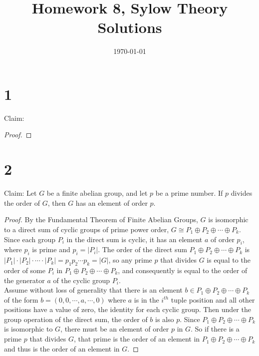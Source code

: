 \documentclass{article}
\title{\textbf{Homework 8, Sylow Theory Solutions}}
\date{}
\date\today
\begin{document}
\maketitle %

\thispagestyle{firstpage}
\section*{1}

Claim: 

\begin{proof}

\end{proof}


\section*{2}

Claim: Let $G$ be a finite abelian group, and let $p$ be a prime number.  If $p$ divides the order of $G$, then $G$ has 
an element of order $p$.

\begin{proof}
    By the Fundamental Theorem of Finite Abelian Groups, $G$ is isomorphic to a direct 
    sum of cyclic groups of prime power order, $G \cong P_1 \oplus P_2 \oplus \cdots \oplus P_k$.  
    Since each group $P_i$ in the direct sum is cyclic, it has an element $a$ of order $p_i$, where 
    $p_i$ is prime and $p_i = |P_i|$.  The order of the direct sum $P_1 \oplus P_2 \oplus \cdots \oplus P_k$ 
    is $|P_1| \cdot |P_2| \cdot \cdots \cdot |P_k| = p_1 p_2 \cdots p_k = |G|$, so any prime $p$ that 
    divides $G$ is equal to the order of some $P_i$ in $P_1 \oplus P_2 \oplus \cdots \oplus P_k$, and 
    consequently is equal to the order of the generator $a$ of the cyclic group $P_i$.  \\ 

    Assume without loss of generality that there is an element $b \in P_1 \oplus P_2 \oplus \cdots \oplus P_k$ 
    of the form $b = (0, 0, \cdots, a, \cdots, 0)$ where $a$ is in the $i^{th}$ tuple position and all other 
    positions have a value of zero, the identity for each cyclic group.  Then under the group operation of the 
    direct sum, the order of $b$ is also $p$.  
    Since $P_1 \oplus P_2 \oplus \cdots \oplus P_k$ is isomorphic to $G$, there must be an element of order 
    $p$ in $G$.  So if there is a prime $p$ that divides $G$, that prime is the order of an element in $P_1 \oplus P_2 \oplus \cdots \oplus P_k$ 
    and thus is the order of an element in $G$.
\end{proof}
\end{document}
